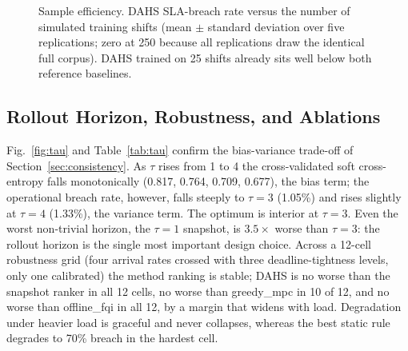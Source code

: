 \documentclass[conference]{IEEEtran}
\begin{document}
\begin{figure}[t]
\centering
{}
\caption{Sample efficiency. DAHS SLA-breach rate versus the number of simulated
training shifts (mean $\pm$ standard deviation over five replications; zero at 250
because all replications draw the identical full corpus). DAHS trained on 25 shifts
already sits well below both reference baselines.}
\label{fig:sample}
\end{figure}

\subsection{Rollout Horizon, Robustness, and Ablations}
\label{sec:horizon}

Fig.~\ref{fig:tau} and Table~\ref{tab:tau} confirm the bias-variance trade-off of
Section~\ref{sec:consistency}. As $\tau$ rises from 1 to 4 the cross-validated soft
cross-entropy falls monotonically (0.817, 0.764, 0.709, 0.677), the bias term; the
operational breach rate, however, falls steeply to $\tau{=}3$ (1.05\%) and rises
slightly at $\tau{=}4$ (1.33\%), the variance term. The optimum is interior at
$\tau = 3$. Even the worst non-trivial horizon, the $\tau{=}1$ snapshot, is
$3.5\times$ worse than $\tau{=}3$: the rollout horizon is the single most important
design choice. Across a 12-cell robustness grid (four arrival rates crossed with
three deadline-tightness levels, only one calibrated) the method ranking is stable;
DAHS is no worse than the snapshot ranker in all 12 cells, no worse than greedy\_mpc
in 10 of 12, and no worse than offline\_fqi in all 12, by a margin that widens with
load. Degradation under heavier load is graceful and never collapses, whereas the
best static rule degrades to 70\% breach in the hardest cell.
\end{document}
